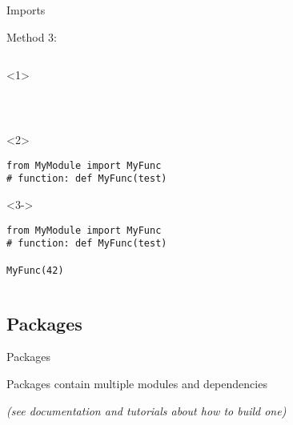 \begin{frame}[fragile]{Imports}

  Method 3: 

  \begin{columns}[onlytextwidth]
    \begin{column}{\textwidth}

      \begin{onlyenv}<1>
        \begin{lstlisting}[style=python]



 \end{lstlisting}
      \end{onlyenv}

      \begin{onlyenv}<2>
        \begin{lstlisting}[style=python]
from MyModule import MyFunc
# function: def MyFunc(test)

 \end{lstlisting}
      \end{onlyenv}

      \begin{onlyenv}<3->
        \begin{lstlisting}[style=python]
from MyModule import MyFunc
# function: def MyFunc(test)

MyFunc(42) \end{lstlisting}
      \end{onlyenv}

    \end{column}
  \end{columns}

\end{frame}


\subsection{Packages}

\begin{frame}[fragile]{Packages}

  \begin{center}

  Packages contain multiple modules and dependencies

  \bigskip

   \textit{(see documentation and tutorials about how to build one)}

  \end{center}

\end{frame}
